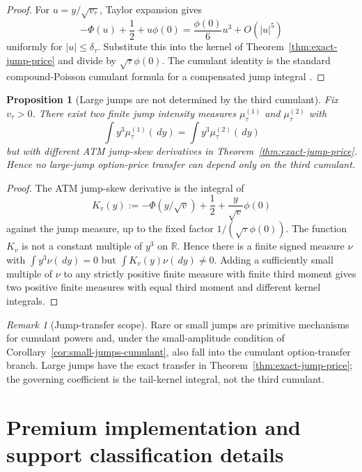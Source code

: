 \documentclass[11pt,a4paper]{amsart}
\theoremstyle{plain}
\newtheorem{proposition}[theorem]{Proposition}
\theoremstyle{definition}
\theoremstyle{remark}
\newtheorem{remark}[theorem]{Remark}
\newcommand{\R}{\mathbb{R}}
\newcommand{\dd}{\,d}
\begin{document}
\begin{proof}
For \(u=y/\sqrt{v_\tau}\), Taylor expansion gives
\[
        -\Phi(u)+\frac12+u\phi(0)
        =
        \frac{\phi(0)}{6}u^3+O(|u|^5)
\]
uniformly for \(|u|\le\delta_\tau\).  Substitute this into the kernel of
Theorem~\ref{thm:exact-jump-price} and divide by \(\sqrt\tau\phi(0)\).  The cumulant identity is
the standard compound-Poisson cumulant formula for a compensated jump integral
\cite{sato1999levy,contTankov2004jumps}.
\end{proof}

\begin{proposition}[Large jumps are not determined by the third cumulant]\label{prop:large-jump-not-cumulant}
Fix \(v_\tau>0\).  There exist two finite jump intensity measures \(\mu_\tau^{(1)}\) and
\(\mu_\tau^{(2)}\) with
\[
        \int y^3\mu_\tau^{(1)}(\dd y)
        =
        \int y^3\mu_\tau^{(2)}(\dd y)
\]
but with different ATM jump-skew derivatives in Theorem~\ref{thm:exact-jump-price}.  Hence no
large-jump option-price transfer can depend only on the third cumulant.
\end{proposition}

\begin{proof}
The ATM jump-skew derivative is the integral of
\[
        K_v(y):=-\Phi(y/\sqrt v)+\frac12+\frac{y}{\sqrt v}\phi(0)
\]
against the jump measure, up to the fixed factor \(1/(\sqrt\tau\phi(0))\).  The function \(K_v\)
is not a constant multiple of \(y^3\) on \(\R\).  Hence there is a finite signed measure \(\nu\)
with \(\int y^3\nu(\dd y)=0\) but \(\int K_v(y)\nu(\dd y)\ne0\).  Adding a sufficiently small
multiple of \(\nu\) to any strictly positive finite measure with finite third moment gives two
positive finite measures with equal third moment and different kernel integrals.
\end{proof}

\begin{remark}[Jump-transfer scope]\label{rem:jump-transfer-scope}
Rare or small jumps are primitive mechanisms for cumulant powers and, under the small-amplitude
condition of Corollary~\ref{cor:small-jumps-cumulant}, also fall into the cumulant option-transfer
branch.  Large jumps have the exact transfer in Theorem~\ref{thm:exact-jump-price}; the governing
coefficient is the tail-kernel integral, not the third cumulant.
\end{remark}



\section{Premium implementation and support classification details}
\label{sec:premium-implementation-appendix}
\end{document}

